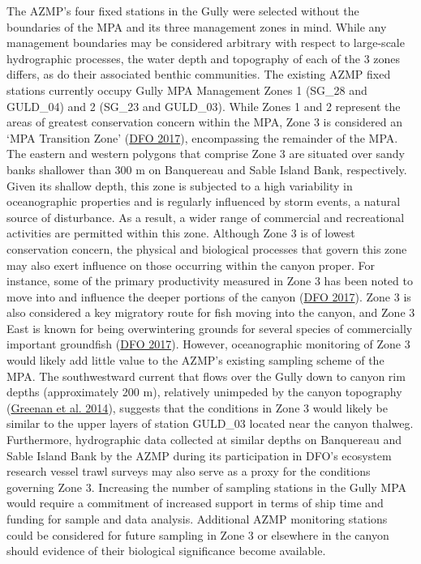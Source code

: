 \documentclass[12pt]{article}\usepackage[]{graphicx}\usepackage[]{color}
\begin{document}
The AZMP's four fixed stations in the Gully were selected without the boundaries of the MPA and its three management zones in mind. While any management boundaries may be considered arbitrary with respect to large-scale hydrographic processes, the water depth and topography of each of the 3 zones differs, as do their associated benthic communities. The existing AZMP fixed stations currently occupy Gully MPA Management Zones 1 (SG\_28 and GULD\_04) and 2 (SG\_23 and GULD\_03). While Zones 1 and 2 represent the areas of greatest conservation concern within the MPA, Zone 3 is considered an `MPA Transition Zone' (\protect\hyperlink{ref-dfo_2017}{DFO 2017}), encompassing the remainder of the MPA. The eastern and western polygons that comprise Zone 3 are situated over sandy banks shallower than 300 m on Banquereau and Sable Island Bank, respectively. Given its shallow depth, this zone is subjected to a high variability in oceanographic properties and is regularly influenced by storm events, a natural source of disturbance. As a result, a wider range of commercial and recreational activities are permitted within this zone. Although Zone 3 is of lowest conservation concern, the physical and biological processes that govern this zone may also exert influence on those occurring within the canyon proper. For instance, some of the primary productivity measured in Zone 3 has been noted to move into and influence the deeper portions of the canyon (\protect\hyperlink{ref-dfo_2017}{DFO 2017}). Zone 3 is also considered a key migratory route for fish moving into the canyon, and Zone 3 East is known for being overwintering grounds for several species of commercially important groundfish (\protect\hyperlink{ref-dfo_2017}{DFO 2017}). However, oceanographic monitoring of Zone 3 would likely add little value to the AZMP's existing sampling scheme of the MPA. The southwestward current that flows over the Gully down to canyon rim depths (approximately 200 m), relatively unimpeded by the canyon topography (\protect\hyperlink{ref-greenan_2014}{Greenan et al. 2014}), suggests that the conditions in Zone 3 would likely be similar to the upper layers of station GULD\_03 located near the canyon thalweg. Furthermore, hydrographic data collected at similar depths on Banquereau and Sable Island Bank by the AZMP during its participation in DFO's ecosystem research vessel trawl surveys may also serve as a proxy for the conditions governing Zone 3. Increasing the number of sampling stations in the Gully MPA would require a commitment of increased support in terms of ship time and funding for sample and data analysis. Additional AZMP monitoring stations could be considered for future sampling in Zone 3 or elsewhere in the canyon should evidence of their biological significance become available.
\end{document}
